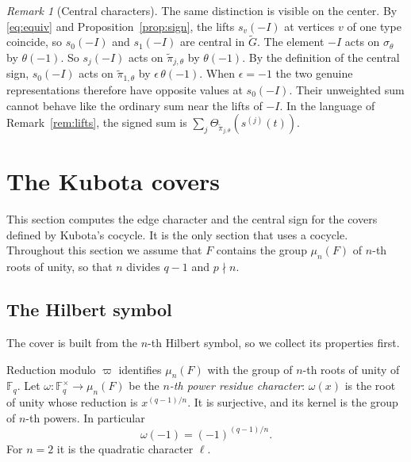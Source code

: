 \documentclass[12pt,letterpaper]{article}
\numberwithin{equation}{section}
\theoremstyle{definition}
\theoremstyle{remark}
\newtheorem{remark}[theorem]{Remark}
\newcommand{\kk}{\mathbb F_q}
\newcommand{\Gt}{\widetilde G}
\newcommand{\sgn}{\epsilon}
\begin{document}
\begin{remark}[Central characters]\label{rem:central}
The same distinction is visible on the center. By \eqref{eq:equiv} and Proposition~\ref{prop:sign}, the lifts $s_v(-I)$ at vertices $v$ of one type coincide, so $s_0(-I)$ and $s_1(-I)$ are central in $\Gt$. The element $-I$ acts on $\sigma_\theta$ by $\theta(-1)$. So $s_j(-I)$ acts on $\widetilde\pi_{j,\theta}$ by $\theta(-1)$. By the definition of the central sign, $s_0(-I)$ acts on $\widetilde\pi_{1,\theta}$ by $\sgn\,\theta(-1)$. When $\sgn=-1$ the two genuine representations therefore have opposite values at $s_0(-I)$. Their unweighted sum cannot behave like the ordinary sum near the lifts of $-I$. In the language of Remark~\ref{rem:lifts}, the signed sum is $\sum_j\Theta_{\widetilde\pi_{j,\theta}}(s^{(j)}(t))$.
\end{remark}

\section{The Kubota covers}\label{sec:kubota}
This section computes the edge character and the central sign for the covers defined by Kubota's cocycle. It is the only section that uses a cocycle. Throughout this section we assume that $F$ contains the group $\mu_n(F)$ of $n$-th roots of unity, so that $n$ divides $q-1$ and $p\nmid n$.

\subsection*{The Hilbert symbol}
The cover is built from the $n$-th Hilbert symbol, so we collect its properties first.

Reduction modulo $\varpi$ identifies $\mu_n(F)$ with the group of $n$-th roots of unity of $\kk$. Let $\omega:\kk^\times\to\mu_n(F)$ be the \emph{$n$-th power residue character}: $\omega(x)$ is the root of unity whose reduction is $x^{(q-1)/n}$. It is surjective, and its kernel is the group of $n$-th powers. In particular
\begin{equation}\label{eq:omega-1}
 \omega(-1)=(-1)^{(q-1)/n}.
\end{equation}
For $n=2$ it is the quadratic character $\ell$.
\end{document}
